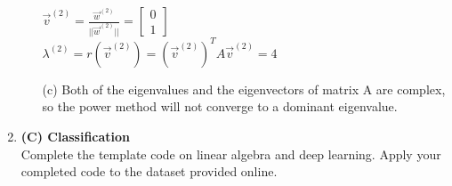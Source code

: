 \documentclass[12pt]{article}
\begin{document}
\begin{enumerate}[label=\bfseries Problem \arabic*:]
\begin{itemize}
    $\vec{v}^{(2)}=\frac{\vec{w}^{(2)}}{||\vec{w}^{(2)}||}=\begin{bmatrix}
    0\\
    1
    \end{bmatrix}$\\
    $\lambda^{(2)}=r(\vec{v}^{(2)})=(\vec{v}^{(2)})^TA\vec{v}^{(2)}=4$\\
    \item [(c)] Both of the eigenvalues and the eigenvectors of matrix A are complex, so the power method will not converge to a dominant eigenvalue.
\end{itemize}
    \newpage
 \item \textbf{(C) Classification}\\
Complete the template code on linear algebra and deep learning. Apply your completed code to the dataset provided online. 


\end{enumerate}
\end{document}
